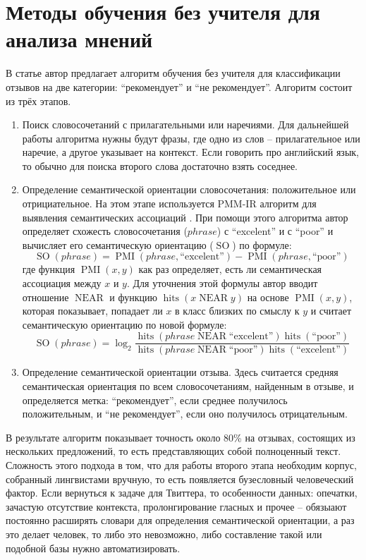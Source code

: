\section{Методы обучения без учителя для анализа мнений}
В статье \cite{pang2002thumbs} автор предлагает алгоритм обучения без учителя для классификации
отзывов на две категории: ``рекомендует'' и ``не рекомендует''. Алгоритм состоит из трёх
этапов.
\begin{enumerate}
\item Поиск словосочетаний с прилагательными или наречиями. Для дальнейшей работы алгоритма нужны
  будут фразы, где одно из слов -- прилагательное или наречие, а другое указывает на контекст. Если
  говорить про английский язык, то обычно для поиска второго слова достаточно взять соседнее.
\item Определение семантической ориентации словосочетания: положительное или отрициательное. На этом
  этапе используется PMM-IR алгоритм для выявления семантических ассоциаций
  \cite{Church:1989:PWA:1075434.1075449}. При помощи этого алгоритма автор определяет схожесть словосочетания ($phrase$)
  с ``excelent'' и с ``poor'' и вычисляет его семантическую ориентацию ($\operatorname{SO}$) по формуле:
$$\operatorname{SO}(phrase) = \operatorname{PMI}(phrase, \textrm{``excelent''}) -
\operatorname{PMI}(phrase, \textrm{``poor''})$$
где функция $\operatorname{PMI}(x,y)$ как раз определяет, есть ли семантическая ассоциация между $x$ и $y$. Для уточнения этой
формулы автор вводит отношение $\operatorname{NEAR}$ и функцию $\operatorname{hits}(x
\operatorname{NEAR} y)$ на основе $\operatorname{PMI}(x,y)$, которая показывает, попадает ли
$x$ в класс близких по смыслу к $y$ и считает семантическую ориентацию  по новой формуле:
$$
\operatorname{SO}(phrase)
= \log_2 \frac
          {\operatorname{hits}(phrase \operatorname{NEAR} \textrm{``excelent''}) \operatorname{hits}(\textrm{``poor''})}
          {\operatorname{hits}(phrase \operatorname{NEAR} \textrm{``poor''}) \operatorname{hits}(\textrm{``excelent''})}
$$
\item Определение семантической ориентации отзыва. Здесь считается средняя семантическая ориентация
  по всем словосочетаниям, найденным в отзыве, и определяется метка: ``рекомендует'', если среднее
  получилось положительным, и ``не рекомендует'', если оно получилось отрицательным.
\end{enumerate}
В результате алгоритм показывает точность около 80\% на отзывах, состоящих из нескольких
предложений, то есть представляющих собой полноценный текст. Сложность этого подхода в том, что для
работы второго этапа необходим корпус, собранный лингвистами вручную, то есть появляется бузесловный
человеческий фактор. Если вернуться к задаче для Твиттера, то особенности данных: опечатки,
зачастую отсутствие контекста, пролонгирование гласных и прочее -- обязыают постоянно расширять
словари для определения семантической ориентации, а раз это делает человек, то либо это невозможно,
либо составление такой или подобной базы нужно автоматизировать.

